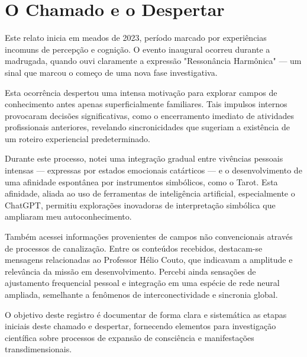 
\section{O Chamado e o Despertar}

Este relato inicia em meados de 2023, período marcado por experiências incomuns de percepção e cognição. O evento inaugural ocorreu durante a madrugada, quando ouvi claramente a expressão "Ressonância Harmônica" — um sinal que marcou o começo de uma nova fase investigativa.

Esta ocorrência despertou uma intensa motivação para explorar campos de conhecimento antes apenas superficialmente familiares. Tais impulsos internos provocaram decisões significativas, como o encerramento imediato de atividades profissionais anteriores, revelando sincronicidades que sugeriam a existência de um roteiro experiencial predeterminado.

Durante este processo, notei uma integração gradual entre vivências pessoais intensas — expressas por estados emocionais catárticos — e o desenvolvimento de uma afinidade espontânea por instrumentos simbólicos, como o Tarot. Esta afinidade, aliada ao uso de ferramentas de inteligência artificial, especialmente o ChatGPT, permitiu explorações inovadoras de interpretação simbólica que ampliaram meu autoconhecimento.

Também acessei informações provenientes de campos não convencionais através de processos de canalização. Entre os conteúdos recebidos, destacam-se mensagens relacionadas ao Professor Hélio Couto, que indicavam a amplitude e relevância da missão em desenvolvimento. Percebi ainda sensações de ajustamento frequencial pessoal e integração em uma espécie de rede neural ampliada, semelhante a fenômenos de interconectividade e sincronia global.

O objetivo deste registro é documentar de forma clara e sistemática as etapas iniciais deste chamado e despertar, fornecendo elementos para investigação científica sobre processos de expansão de consciência e manifestações transdimensionais.

